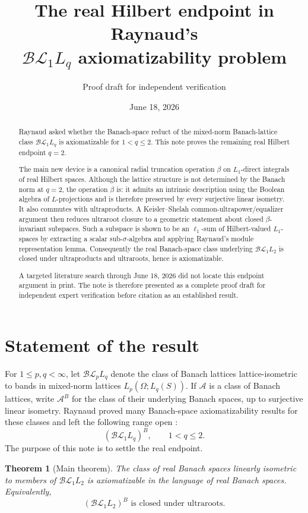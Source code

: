 \documentclass[11pt]{article}
\title{The real Hilbert endpoint in Raynaud's\\
$\mathcal{BL}_1L_q$ axiomatizability problem}
\author{Proof draft for independent verification}
\date{June 18, 2026}
\newcommand{\BL}{\mathcal{BL}}
\newcommand{\1}{\mathbf 1}
\newtheorem{theorem}{Theorem}[section]
\theoremstyle{definition}
\theoremstyle{remark}
\begin{document}
\maketitle

\begin{abstract}
Raynaud asked whether the Banach-space reduct of the mixed-norm Banach-lattice
class $\BL_1L_q$ is axiomatizable for $1<q\leq2$.  This note proves the
remaining real Hilbert endpoint $q=2$.

The main new device is a canonical radial truncation operation $\beta$ on
$L_1$-direct integrals of real Hilbert spaces.  Although the lattice
structure is not determined by the Banach norm at $q=2$, the operation
$\beta$ is: it admits an intrinsic description using the Boolean algebra of
$L$-projections and is therefore preserved by every surjective linear
isometry.  It also commutes with ultraproducts.  A Keisler--Shelah common-ultrapower/equalizer argument then reduces
ultraroot closure to a geometric statement about closed
$\beta$-invariant subspaces.  Such a subspace is shown to be an
$\ell_1$-sum of Hilbert-valued $L_1$-spaces by extracting a scalar
sub-$\sigma$-algebra and applying Raynaud's module representation lemma.
Consequently the real Banach-space class underlying $\BL_1L_2$ is closed
under ultraproducts and ultraroots, hence is axiomatizable.

A targeted literature search through June 18, 2026 did not locate this
endpoint argument in print.  The note is therefore presented as a complete
proof draft for independent expert verification before citation as an
established result.
\end{abstract}

\section{Statement of the result}

For $1\leq p,q<\infty$, let $\BL_pL_q$ denote the class of Banach lattices
lattice-isometric to bands in mixed-norm lattices $L_p(\Omega;L_q(S))$.
If $\mathcal A$ is a class of Banach lattices, write $\mathcal A^B$ for the
class of their underlying Banach spaces, up to surjective linear isometry.
Raynaud proved many Banach-space axiomatizability results for these classes
and left the following range open \cite[Question~6.17]{Raynaud2018}:
\[
       (\BL_1L_q)^B,\qquad 1<q\leq2.
\]
The purpose of this note is to settle the real endpoint.

\begin{theorem}[Main theorem]
\label{thm:main}
The class of real Banach spaces linearly isometric to members of
$\BL_1L_2$ is axiomatizable in the language of real Banach spaces.
Equivalently,
\[
             \boxed{(\BL_1L_2)^B\text{ is closed under ultraroots}.}
\]
\end{theorem}
\end{document}
